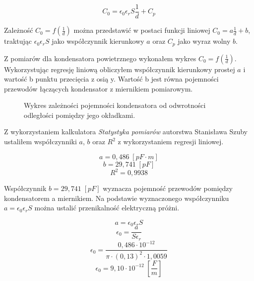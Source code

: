 \documentclass[polish, a4paper]{article}
\begin{document}
\begin{equation}
C_0 = \epsilon_0 \epsilon_r S \frac{1}{d} + C_p
\end{equation}

Zależność $C_0 = f(\frac{1}{d})$ można przedstawić w postaci funkcji liniowej $C_0 = a\frac{1}{d} + b$, 
traktując $\epsilon_0\epsilon_rS$ jako współczynnik kierunkowy $a$ oraz $C_p$ jako wyraz wolny $b$.

Z pomiarów dla kondensatora powietrznego wykonałem wykres $C_0 = f(\frac{1}{d})$.
Wykorzystując regresję liniową obliczyłem współczynnik kierunkowy prostej $a$ i wartość b punktu przecięcia z osią y. Wartość b jest równa pojemności przewodów łączących kondensator z miernikiem pomiarowym.

\begin{figure}[H]
\centering
{}
\caption{Wykres zależności pojemności kondensatora od odwrotności odległości pomiędzy jego okładkami.}
\end{figure}

Z wykorzystaniem kalkulatora \emph{Statystyka pomiarów} autorstwa Stanisława Szuby 
ustaliłem współczynniki $a$, $b$ oraz $R^2$ z wykorzystaniem regresji liniowej.

\begin{equation}
a = 0,486 \;[pF \cdot m]
\end{equation}
\begin{equation}
b = 29,741 \; [pF]
\end{equation}
\begin{equation}
R^2 = 0,9938
\end{equation}

Współczynnik $b = 29,741 \; [pF]$ wyznacza pojemność przewodów pomiędzy kondensatorem a miernikiem.
Na podstawie wyznaczonego współczynniku $a = \epsilon_0\epsilon_rS$ można ustalić przenikalność elektryczną próżni.

\begin{equation}
a = \epsilon_0\epsilon_rS
\end{equation}
\begin{equation}
\epsilon_0 = \frac{a}{S\epsilon_r}
\end{equation}
\begin{equation}
\epsilon_0 = \frac{0,486 \cdot 10^{-12}}{\pi \cdot (0,13)^2 \cdot 1,0059}
\end{equation}
\begin{equation}
\epsilon_0 = 9,10 \cdot 10^{-12} \; [\frac{F}{m}]
\end{equation}
\end{document}
